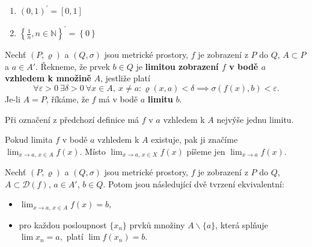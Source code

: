 \begin{priklad}
	\,
	\begin{enumerate}[(1)]
		\item $(0,1)^\prime = [0,1]$
		\item $\left \{ \frac{1}{n}, n \in \mathbb N  \right \}^\prime = \left \{ 0 \right \}  $
	\end{enumerate}
\end{priklad}

\begin{definice}
Nechť $(P,\varrho)$ a $(Q,\sigma)$ jsou metrické prostory, $f$ je zobrazení z $P$ do $Q$, $A\subset P$ a $a\in A'$. Řekneme, že prvek $b\in Q$ je \textbf{limitou zobrazení $f$ v bodě $a$ vzhledem k množině} $A$, jestliže platí
\[
\forall \varepsilon>0\ \exists \delta>0\ \forall x\in A,\ x\neq a :
\varrho(x,a)<\delta \implies \sigma(f(x),b)<\varepsilon.
\]
Je-li $A=P$, říkáme, že $f$ má v bodě $a$ \textbf{limitu} $b$.
\end{definice}

\begin{poznamka}
	Při označení z předchozí definice má $f$ v $a$ vzhledem k $A$ nejvýše jednu limitu.
\end{poznamka}

\begin{oznaceni}
Pokud limita $f$ v bodě $a$ vzhledem k $A$ existuje, pak ji značíme
$
\lim_{x\to a,\, x\in A} f(x).
$
Místo
$
\lim_{x\to a,\, x\in X} f(x)
$
píšeme jen
$
\lim_{x\to a} f(x).
$
\end{oznaceni}

\begin{veta}[Heine]\label{veta9.7}
Nechť $(P,\varrho)$ a $(Q,\sigma)$ jsou metrické prostory, $f$ je zobrazení z $P$ do $Q$, $A\subset \mathcal D(f)$, $a\in A'$, $b\in Q$. Potom jsou následující dvě tvrzení ekvivalentní:
\begin{itemize}
    \item[(i)]
    $
    \lim_{x\to a,\, x\in A} f(x)=b,
    $

    \item[(ii)] pro každou posloupnost $\{x_n\}$ prvků množiny $A\smallsetminus\{a\}$, která splňuje
    $
    \lim x_n=a,
    $
    platí
    $
    \lim f(x_n)=b.
    $
\end{itemize}
\end{veta}

